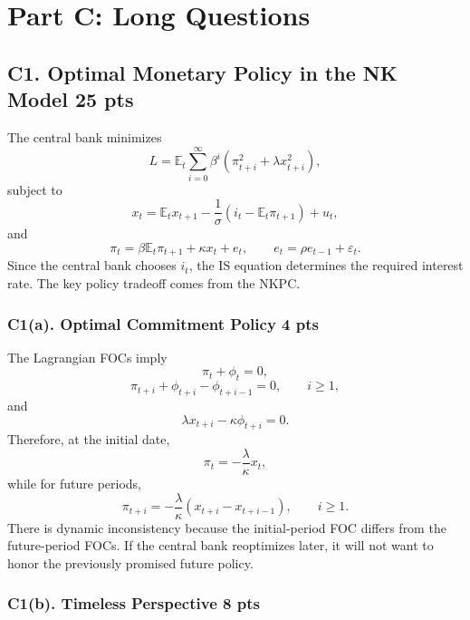 \documentclass[11pt]{article}
\begin{document}
\clearpage
\section*{Part C: Long Questions}

\subsection*{C1. Optimal Monetary Policy in the NK Model \hfill 25 pts}

The central bank minimizes
\[
L=\mathbb{E}_t\sum_{i=0}^{\infty}\beta^i
\left(\pi_{t+i}^2+\lambda x_{t+i}^2\right),
\]
subject to
\[
x_t=\mathbb{E}_tx_{t+1}-\frac{1}{\sigma}(i_t-\mathbb{E}_t\pi_{t+1})+u_t,
\]
and
\[
\pi_t=\beta \mathbb{E}_t\pi_{t+1}+\kappa x_t+e_t,
\qquad
 e_t=\rho e_{t-1}+\varepsilon_t.
\]
Since the central bank chooses \(i_t\), the IS equation determines the required interest rate. The key policy tradeoff comes from the NKPC.

\subsubsection*{C1(a). Optimal Commitment Policy \hfill 4 pts}

The Lagrangian FOCs imply
\[
\pi_t+\phi_t=0,
\]
\[
\pi_{t+i}+\phi_{t+i}-\phi_{t+i-1}=0,
\qquad i\geq 1,
\]
and
\[
\lambda x_{t+i}-\kappa\phi_{t+i}=0.
\]
Therefore, at the initial date,
\[
\pi_t=-\frac{\lambda}{\kappa}x_t,
\]
while for future periods,
\[
\pi_{t+i}
=
-\frac{\lambda}{\kappa}(x_{t+i}-x_{t+i-1}),
\qquad i\geq 1.
\]
There is dynamic inconsistency because the initial-period FOC differs from the future-period FOCs. If the central bank reoptimizes later, it will not want to honor the previously promised future policy.

\clearpage
\subsubsection*{C1(b). Timeless Perspective \hfill 8 pts}
\end{document}
